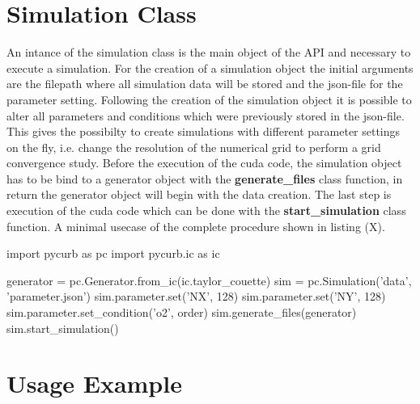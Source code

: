 \section{Simulation Class}

An intance of the simulation class is the main object of the API and
necessary to execute a simulation. For the creation of a simulation object
the initial arguments are the filepath where all simulation data will be stored
and the json-file for the parameter setting.
Following the creation of the simulation object it is possible to alter all parameters and conditions
which were previously stored in the json-file. This gives the possibilty to create
simulations with different parameter settings on the fly, i.e. change the resolution of the numerical grid
to perform a grid convergence study.
Before the execution of the cuda code, the simulation object has to be bind to a generator object
with the \textbf{generate\_files} class function, in return the generator object will begin
with the data creation. The last step is execution of the cuda code which can be done with the \textbf{start\_simulation}
class function.  A minimal usecase of the complete procedure shown in listing (X).


\begin{python}[caption='Generator class usage']
import pycurb as pc
import pycurb.ic as ic

generator = pc.Generator.from_ic(ic.taylor_couette)
sim = pc.Simulation('data', 'parameter.json')
sim.parameter.set('NX', 128)
sim.parameter.set('NY', 128)
sim.parameter.set_condition('o2', order)
sim.generate_files(generator)
sim.start_simulation()
\end{python}

\section{Usage Example}

